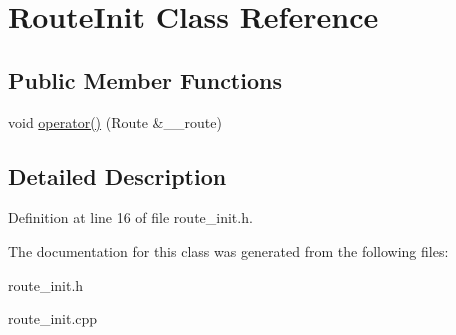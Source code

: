 \hypertarget{classRouteInit}{
\section{Route\-Init Class Reference}
\label{classRouteInit}
}
\subsection*{Public Member Functions}
\begin{CompactItemize}
\item 
\hypertarget{classRouteInit_b65a7137e114458faadb6a5510c001f7}{
void \hyperlink{classRouteInit_b65a7137e114458faadb6a5510c001f7}{operator()} (Route \&\_\-\_\-route)}
\label{classRouteInit_b65a7137e114458faadb6a5510c001f7}

\end{CompactItemize}


\subsection{Detailed Description}




Definition at line 16 of file route\_\-init.h.

The documentation for this class was generated from the following files:\begin{CompactItemize}
\item 
route\_\-init.h\item 
route\_\-init.cpp\end{CompactItemize}
